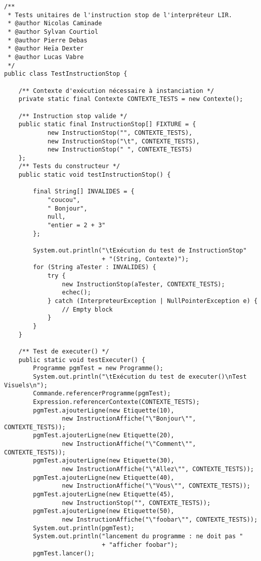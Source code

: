 \begin{enum}
\begin{verbatim}
/**
 * Tests unitaires de l'instruction stop de l'interpréteur LIR.
 * @author Nicolas Caminade
 * @author Sylvan Courtiol
 * @author Pierre Debas
 * @author Heïa Dexter
 * @author Lucas Vabre
 */
public class TestInstructionStop {
    
    /** Contexte d'exécution nécessaire à instanciation */
    private static final Contexte CONTEXTE_TESTS = new Contexte();
    
    /** Instruction stop valide */
    public static final InstructionStop[] FIXTURE = {
            new InstructionStop("", CONTEXTE_TESTS),
            new InstructionStop("\t", CONTEXTE_TESTS),
            new InstructionStop(" ", CONTEXTE_TESTS)
    };
    /** Tests du constructeur */
    public static void testInstructionStop() {
        
        final String[] INVALIDES = {
            "coucou",
            " Bonjour",
            null,
            "entier = 2 + 3"
        };
        
        System.out.println("\tExécution du test de InstructionStop"
                           + "(String, Contexte)");
        for (String aTester : INVALIDES) {
            try {
                new InstructionStop(aTester, CONTEXTE_TESTS);
                echec();
            } catch (InterpreteurException | NullPointerException e) {
                // Empty block
            }
        }
    }
    
    /** Test de executer() */
    public static void testExecuter() {
        Programme pgmTest = new Programme();
        System.out.println("\tExécution du test de executer()\nTest Visuels\n");
        Commande.referencerProgramme(pgmTest);
        Expression.referencerContexte(CONTEXTE_TESTS);
        pgmTest.ajouterLigne(new Etiquette(10), 
                new InstructionAffiche("\"Bonjour\"", CONTEXTE_TESTS));
        pgmTest.ajouterLigne(new Etiquette(20), 
                new InstructionAffiche("\"Comment\"", CONTEXTE_TESTS));
        pgmTest.ajouterLigne(new Etiquette(30), 
                new InstructionAffiche("\"Allez\"", CONTEXTE_TESTS));
        pgmTest.ajouterLigne(new Etiquette(40), 
                new InstructionAffiche("\"Vous\"", CONTEXTE_TESTS));
        pgmTest.ajouterLigne(new Etiquette(45), 
                new InstructionStop("", CONTEXTE_TESTS));
        pgmTest.ajouterLigne(new Etiquette(50), 
                new InstructionAffiche("\"foobar\"", CONTEXTE_TESTS));
        System.out.println(pgmTest);
        System.out.println("lancement du programme : ne doit pas "
                           + "afficher foobar");
        pgmTest.lancer();
        

\end{verbatim}
\end{enum}
